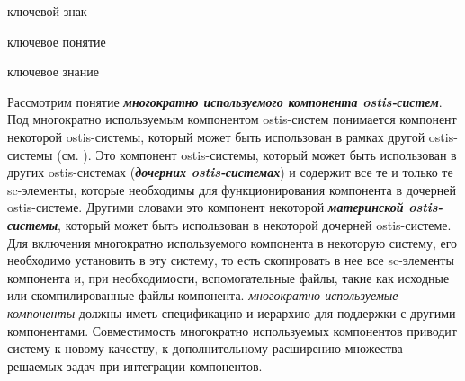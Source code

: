 \begin{SCn}
\begin{scnrelfromlist}{ключевой знак}
\end{scnrelfromlist}
\end{SCn}

\begin{SCn}
\begin{scnrelfromlist}{ключевое понятие}
\end{scnrelfromlist}
\end{SCn}

\begin{SCn}
\begin{scnrelfromlist}{ключевое знание}
\end{scnrelfromlist}
\end{SCn}

\bigskip

Рассмотрим понятие \textbf{\textit{многократно используемого компонента ostis-систем}}. Под многократно используемым компонентом ostis-систем понимается компонент некоторой ostis-системы, который может быть использован в рамках другой ostis-системы (см. ). Это компонент ostis-системы, который может быть использован в других ostis-системах (\textbf{\textit{дочерних ostis-системах}}) и содержит все те и только те sc-элементы, которые необходимы для функционирования компонента в дочерней ostis-системе. Другими словами это компонент некоторой \textbf{\textit{материнской ostis-системы}}, который может быть использован в некоторой дочерней ostis-системе. Для включения многократно используемого компонента в некоторую систему, его необходимо установить в эту систему, то есть скопировать в нее все sc-элементы компонента и, при необходимости, вспомогательные файлы, такие как исходные или скомпилированные файлы компонента. \textit{многократно используемые компоненты} должны иметь  спецификацию и иерархию для поддержки  с другими компонентами. Совместимость многократно используемых компонентов приводит систему к новому качеству, к дополнительному расширению множества решаемых задач при интеграции компонентов.

